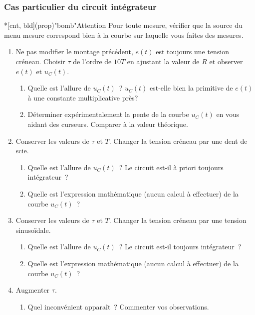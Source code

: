 \documentclass[../main/main.tex]{subfiles}
\begin{document}
\subsubsection{Cas particulier du circuit intégrateur}

\begin{tcb}*[cnt, bld](prop)"bomb"{Attention}
	Pour toute mesure, vérifier que la source du menu mesure correspond bien à
	la courbe sur laquelle vous faites des mesures.
\end{tcb}

\begin{enumerate}
	\item Ne pas modifier le montage précédent, $e(t)$ est toujours une tension
	      créneau. Choisir $\tau$ de l'ordre de $10 T$ en ajustant la valeur de
	      $R$ et observer $e(t)$ et $u_{C}(t)$.
	      \begin{enumerate}[label=\sqenumi, start=4]
		      \item Quelle est l'allure de $u_{C}(t)$~? $u_{C}(t)$ est-elle bien la
		            primitive de $e(t)$ à une constante multiplicative près?
		      \item Déterminer expérimentalement la pente de la courbe $u_{C}(t)$ en
		            vous aidant des curseurs. Comparer à la valeur théorique.
	      \end{enumerate}
	\item Conserver les valeurs de $\tau$ et $T$. Changer la tension créneau par
	      une dent de scie.
	      \begin{enumerate}[label=\sqenumi, start=6]
		      \item Quelle est l'allure de $u_{C}(t)$~? Le circuit est-il à priori
		            toujours intégrateur~?
		      \item Quelle est l'expression mathématique (aucun calcul à effectuer)
		            de la courbe $u_{C}(t)$~?
	      \end{enumerate}
	\item Conserver les valeurs de $\tau$ et $T$. Changer la tension créneau par
	      une tension sinusoïdale.
	      \begin{enumerate}[label=\sqenumi, start=8]
		      \item Quelle est l'allure de $u_{C}(t)$~? Le circuit est-il toujours
		            intégrateur~?
		      \item Quelle est l'expression mathématique (aucun calcul à effectuer)
		            de la courbe $u_{C}(t)$~?
	      \end{enumerate}
	\item Augmenter $\tau$.
	      \begin{enumerate}[label=\sqenumi, start=10]
		      \item Quel inconvénient apparaît~? Commenter vos observations.
	      \end{enumerate}
\end{enumerate}
\end{document}
